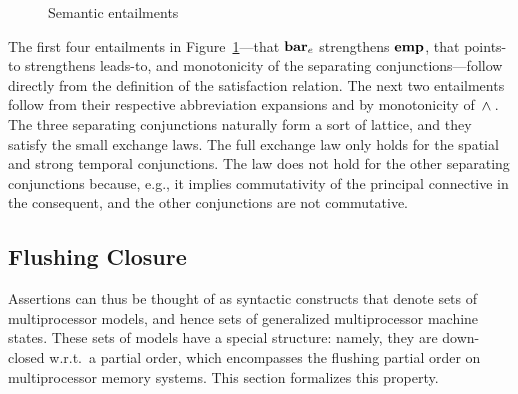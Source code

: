 \documentclass[11pt]{report}
\begin{document}
\begin{figure}[ht]
	\centering
	\caption{\label{fig:entailments}Semantic entailments}
\end{figure}

The first four entailments in Figure~\ref{fig:entailments}---that $\mathbf{bar}_{e}$ strengthens $\mathbf{emp}$, that points-to strengthens leads-to, and monotonicity of the separating conjunctions---follow directly from the definition of the satisfaction relation. The next two entailments follow from their respective abbreviation expansions and by monotonicity of $\operatorname{\,\wedge\,}$. The three separating conjunctions naturally form a sort of lattice, and they satisfy the small exchange laws. The full exchange law only holds for the spatial and strong temporal conjunctions. The law does not hold for the other separating conjunctions because, e.g., it implies commutativity of the principal connective in the consequent, and the other conjunctions are not commutative. 

\subsection{Flushing Closure}
\label{sec:predicates}

Assertions can thus be thought of as syntactic constructs that denote sets of multiprocessor models, and hence sets of generalized multiprocessor machine states. These sets of models have a special structure: namely, they are down-closed w.r.t.\ a partial order, which encompasses the flushing partial order on multiprocessor memory systems. This section formalizes this property. 
\end{document}
